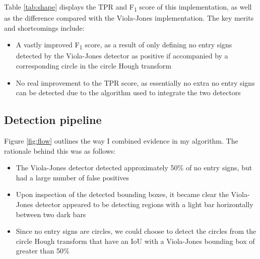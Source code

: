 \documentclass[twocolumn, 10pt, a4paper]{article}
\begin{document}
Table \ref{tab:shape} displays the TPR and F\textsubscript{1} score of this implementation, as well as the difference compared with the Viola-Jones implementation.
The key merits and shortcomings include:
\begin{itemize}
\itemsep 0em 
\item A vastly improved F\textsubscript{1} score, as a result of only defining no entry signs detected by the Viola-Jones detector as positive if accompanied by a corresponding circle in the circle Hough transform
\item No real improvement to the TPR score, as essentially no extra no entry signs can be detected due to the algorithm used to integrate the two detectors
\end{itemize}

\subsection{Detection pipeline}

Figure \ref{fig:flow} outlines the way I combined evidence in my algorithm.
The rationale behind this was as follows:
\begin{itemize}
\itemsep 0em 
\item The Viola-Jones detector detected approximately 50\% of no entry signs, but had a large number of false positives
\item Upon inspection of the detected bounding boxes, it became clear the Viola-Jones detector appeared to be detecting regions with a light bar horizontally between two dark bars
\item Since no entry signs are circles, we could choose to detect the circles from the circle Hough transform that have an IoU with a Viola-Jones bounding box of greater than 50\%
\end{itemize}
\end{document}
